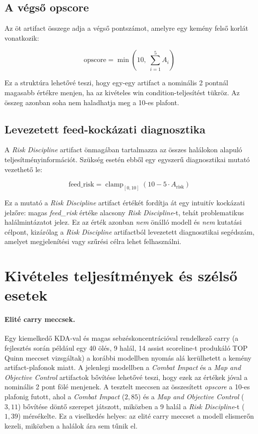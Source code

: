 \subsection{A végső opscore}

Az öt artifact összege adja a végső pontszámot, amelyre egy kemény felső korlát vonatkozik:

\begin{equation}
\text{opscore} = \min\!\left(10,\; \sum_{i=1}^{5} A_i\right)
\end{equation}

Ez a struktúra lehetővé teszi, hogy egy-egy artifact a nominális 2 pontnál magasabb értékre menjen, ha az kivételes win condition-teljesítést tükröz. Az összeg azonban soha nem haladhatja meg a 10-es plafont.

\subsection{Levezetett feed-kockázati diagnosztika}

A \textit{Risk Discipline} artifact önmagában tartalmazza az összes halálokon alapuló teljesítményinformációt. Szükség esetén ebből egy egyszerű diagnosztikai mutató vezethető le:

\begin{equation}
\text{feed\_risk} = \operatorname{clamp}_{[0,10]}\!\left(10 - 5 \cdot A_{\text{risk}}\right)
\end{equation}

Ez a mutató a \textit{Risk Discipline} artifact értékét fordítja át egy intuitív kockázati jelzőre: magas \textit{feed\_risk} értéke alacsony \textit{Risk Discipline}-t, tehát problematikus halálmintázatot jelez. Ez az érték azonban \emph{nem} önálló modell és \emph{nem} kutatási célpont, kizárólag a \textit{Risk Discipline} artifactból levezetett diagnosztikai segédszám, amelyet megjelenítési vagy szűrési célra lehet felhasználni.

\section{Kivételes teljesítmények és szélső esetek}

\paragraph{Elité carry meccsek.}
Egy kiemelkedő KDA-val és magas sebzéskoncentrációval rendelkező carry (a fejlesztés során például egy 40 ölés, 9 halál, 14 assist scoreline-t produkáló TOP Quinn meccset vizsgáltak) a korábbi modellben nyomás alá kerülhetett a kemény artifact-plafonok miatt. A jelenlegi modellben a \textit{Combat Impact} és a \textit{Map and Objective Control} artifactok bővítése lehetővé teszi, hogy ezek az értékek jóval a nominális 2 pont fölé menjenek. A tesztelt meccsen az összesített \textit{opscore} a 10-es plafonig futott, ahol a \textit{Combat Impact} ($2{,}85$) és a \textit{Map and Objective Control} ($3{,}11$) bővítése döntő szerepet játszott, miközben a 9 halál a \textit{Risk Discipline}-t ($1{,}39$) mérsékelte. Ez a viselkedés helyes: az elité carry meccset a modell elismerőn kezeli, miközben a halálok ára sem tűnik el.


